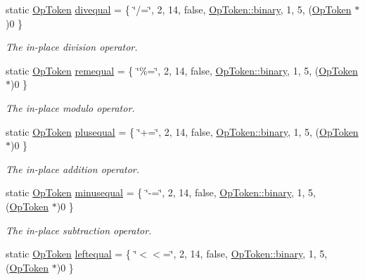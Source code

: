 \begin{DoxyCompactItemize}
static \mbox{\hyperlink{class_op_token}{Op\+Token}} \mbox{\hyperlink{class_print_c_a4a6ff1f6d6449a198b2cecfe4bf4f925}{divequal}} = \{ \char`\"{}/=\char`\"{}, 2, 14, false, \mbox{\hyperlink{class_op_token_af41c7f108d5662ede7765c5a6c44eaffa3a2ec63522a9329a71ddbe8adc3e752d}{Op\+Token\+::binary}}, 1, 5, (\mbox{\hyperlink{class_op_token}{Op\+Token}} $\ast$)0 \}
\begin{DoxyCompactList}\small\item\em The {\itshape in-\/place} {\itshape division} operator. \end{DoxyCompactList}\item 
static \mbox{\hyperlink{class_op_token}{Op\+Token}} \mbox{\hyperlink{class_print_c_a0b244f1e62f37ce148448b07190beae6}{remequal}} = \{ \char`\"{}\%=\char`\"{}, 2, 14, false, \mbox{\hyperlink{class_op_token_af41c7f108d5662ede7765c5a6c44eaffa3a2ec63522a9329a71ddbe8adc3e752d}{Op\+Token\+::binary}}, 1, 5, (\mbox{\hyperlink{class_op_token}{Op\+Token}} $\ast$)0 \}
\begin{DoxyCompactList}\small\item\em The {\itshape in-\/place} {\itshape modulo} operator. \end{DoxyCompactList}\item 
static \mbox{\hyperlink{class_op_token}{Op\+Token}} \mbox{\hyperlink{class_print_c_a2e154fb55cfe918759ac64fb0df9e44e}{plusequal}} = \{ \char`\"{}+=\char`\"{}, 2, 14, false, \mbox{\hyperlink{class_op_token_af41c7f108d5662ede7765c5a6c44eaffa3a2ec63522a9329a71ddbe8adc3e752d}{Op\+Token\+::binary}}, 1, 5, (\mbox{\hyperlink{class_op_token}{Op\+Token}} $\ast$)0 \}
\begin{DoxyCompactList}\small\item\em The {\itshape in-\/place} {\itshape addition} operator. \end{DoxyCompactList}\item 
static \mbox{\hyperlink{class_op_token}{Op\+Token}} \mbox{\hyperlink{class_print_c_ab4764b02a9d4c06c3b76ccd7ea690618}{minusequal}} = \{ \char`\"{}-\/=\char`\"{}, 2, 14, false, \mbox{\hyperlink{class_op_token_af41c7f108d5662ede7765c5a6c44eaffa3a2ec63522a9329a71ddbe8adc3e752d}{Op\+Token\+::binary}}, 1, 5, (\mbox{\hyperlink{class_op_token}{Op\+Token}} $\ast$)0 \}
\begin{DoxyCompactList}\small\item\em The {\itshape in-\/place} {\itshape subtraction} operator. \end{DoxyCompactList}\item 
static \mbox{\hyperlink{class_op_token}{Op\+Token}} \mbox{\hyperlink{class_print_c_ae97ed02c69f5fa9654ca613804444a3a}{leftequal}} = \{ \char`\"{}$<$$<$=\char`\"{}, 2, 14, false, \mbox{\hyperlink{class_op_token_af41c7f108d5662ede7765c5a6c44eaffa3a2ec63522a9329a71ddbe8adc3e752d}{Op\+Token\+::binary}}, 1, 5, (\mbox{\hyperlink{class_op_token}{Op\+Token}} $\ast$)0 \}
$$
\end{DoxyCompactItemize}
